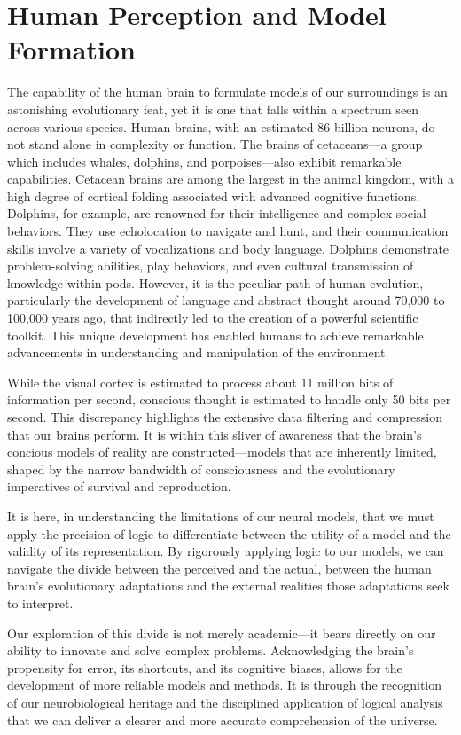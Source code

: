 \documentclass[12pt]{article}
\begin{document}
\section*{Human Perception and Model Formation}
The capability of the human brain to formulate models of our surroundings is an astonishing evolutionary feat, yet it is one that falls within a spectrum seen across various species. Human brains, with an estimated 86 billion neurons, do not stand alone in complexity or function. The brains of cetaceans—a group which includes whales, dolphins, and porpoises—also exhibit remarkable capabilities. Cetacean brains are among the largest in the animal kingdom, with a high degree of cortical folding associated with advanced cognitive functions. Dolphins, for example, are renowned for their intelligence and complex social behaviors. They use echolocation to navigate and hunt, and their communication skills involve a variety of vocalizations and body language. Dolphins demonstrate problem-solving abilities, play behaviors, and even cultural transmission of knowledge within pods. However, it is the peculiar path of human evolution, particularly the development of language and abstract thought around 70,000 to 100,000 years ago, that indirectly led to the creation of a powerful scientific toolkit. This unique development has enabled humans to achieve remarkable advancements in understanding and manipulation of the environment.

While the visual cortex is estimated to process about 11 million bits of information per second, conscious thought is estimated to handle only 50 bits per second. This discrepancy highlights the extensive data filtering and compression that our brains perform. It is within this sliver of awareness that the brain's concious models of reality are constructed—models that are inherently limited, shaped by the narrow bandwidth of consciousness and the evolutionary imperatives of survival and reproduction.

It is here, in understanding the limitations of our neural models, that we must apply the precision of logic to differentiate between the utility of a model and the validity of its representation. By rigorously applying logic to our models, we can navigate the divide between the perceived and the actual, between the human brain's evolutionary adaptations and the external realities those adaptations seek to interpret.

Our exploration of this divide is not merely academic—it bears directly on our ability to innovate and solve complex problems. Acknowledging the brain's propensity for error, its shortcuts, and its cognitive biases, allows for the development of more reliable models and methods. It is through the recognition of our neurobiological heritage and the disciplined application of logical analysis that we can deliver a clearer and more accurate comprehension of the universe.
\end{document}
